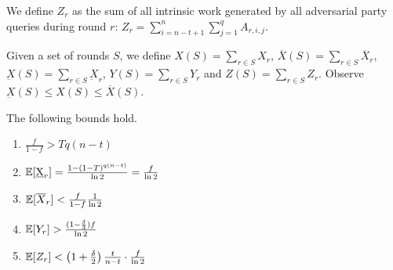 We define $Z_{r}$ as the sum of all intrinsic work generated by all adversarial
party queries during round $r$: $Z_{r} = \sum_{i = n - t + 1}^n \sum_{j = 1}^q A_{r, i, j}$.

Given a set of rounds $S$, we define
$X(S) = \sum_{r \in S} X_r$,
$\overline{X}(S) = \sum_{r \in S} \overline{X}_r$,
$\underbar{X}(S) = \sum_{r \in S} \underbar{X}_r$,
$Y(S) = \sum_{r \in S} Y_r$
and $Z(S) = \sum_{r \in S} Z_r$.
Observe $\underbar{X}(S) \leq X(S) \leq \overline{X}(S)$.

\begin{lemma}\label{lem:expectation-bounds}
  The following bounds hold.
  \begin{enumerate}
    \item $\frac{f}{1 - f} > Tq(n - t)$
    \item $\mathop{{}\mathbb{E}}[\underbar{X}_r] = \frac{1 - (1 - T)^{q(n - t)}}{\ln2} = \frac{f}{\ln2}$
    \item $\mathop{{}\mathbb{E}}[\overline{X}_r] < \frac{f}{1 - f}\frac{1}{\ln2}$
    \item $\mathop{{}\mathbb{E}}[Y_r] > \frac{(1 - \frac{\delta}{3})f}{\ln2}$
    \item $\mathop{{}\mathbb{E}}[Z_r] < \left(1 + \frac{\delta}{2}\right)\frac{t}{n - t} \cdot \frac{f}{\ln2}$
  \end{enumerate}
\end{lemma}
